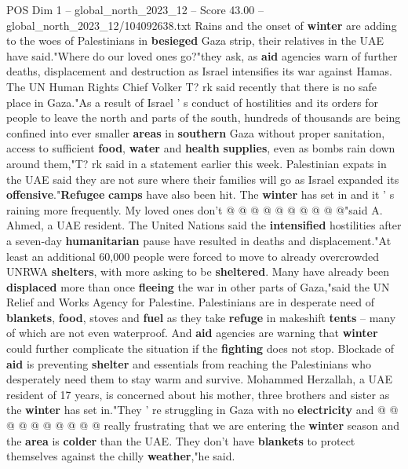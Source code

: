 \begin{textsample}{POS Dim 1 – global\_north\_2023\_12 – Score 43.00 – global\_north\_2023\_12/104092638.txt}  \label{ex:f1_pos_089}
Rains and the onset of \textbf{winter} are adding to the woes of Palestinians in \textbf{besieged} Gaza strip, their relatives in the UAE have said."Where do our loved ones go?"they ask, as \textbf{aid} agencies warn of further deaths, displacement and destruction as Israel intensifies its war against Hamas.
The UN Human Rights Chief Volker T? rk said recently that there is no safe place in Gaza."As a result of Israel ' s conduct of hostilities and its orders for people to leave the north and parts of the south, hundreds of thousands are being confined into ever smaller \textbf{areas} in \textbf{southern} Gaza without proper sanitation, access to sufficient \textbf{food}, \textbf{water} and \textbf{health} \textbf{supplies}, even as bombs rain down around them,"T? rk said in a statement earlier this week.
Palestinian expats in the UAE said they are not sure where their families will go as Israel expanded its \textbf{offensive}."\textbf{Refugee} \textbf{camps} have also been hit.
The \textbf{winter} has set in and it ' s raining more frequently.
My loved ones don't @ @ @ @ @ @ @ @ @ @"said A.
Ahmed, a UAE resident.
The United Nations said the \textbf{intensified} hostilities after a seven-day \textbf{humanitarian} pause have resulted in deaths and displacement."At least an additional 60,000 people were forced to move to already overcrowded UNRWA \textbf{shelters}, with more asking to be \textbf{sheltered}.
Many have already been \textbf{displaced} more than once \textbf{fleeing} the war in other parts of Gaza,"said the UN Relief and Works Agency for Palestine.
Palestinians are in desperate need of \textbf{blankets}, \textbf{food}, stoves and \textbf{fuel} as they take \textbf{refuge} in makeshift \textbf{tents} -- many of which are not even waterproof.
And \textbf{aid} agencies are warning that \textbf{winter} could further complicate the situation if the \textbf{fighting} does not stop.
Blockade of \textbf{aid} is preventing \textbf{shelter} and essentials from reaching the Palestinians who desperately need them to stay warm and survive.
Mohammed Herzallah, a UAE resident of 17 years, is concerned about his mother, three brothers and sister as the \textbf{winter} has set in."They ' re struggling in Gaza with no \textbf{electricity} and @ @ @ @ @ @ @ @ @ @ really frustrating that we are entering the \textbf{winter} season and the \textbf{area} is \textbf{colder} than the UAE.
They don't have \textbf{blankets} to protect themselves against the chilly \textbf{weather},"he said.

\end{textsample}
